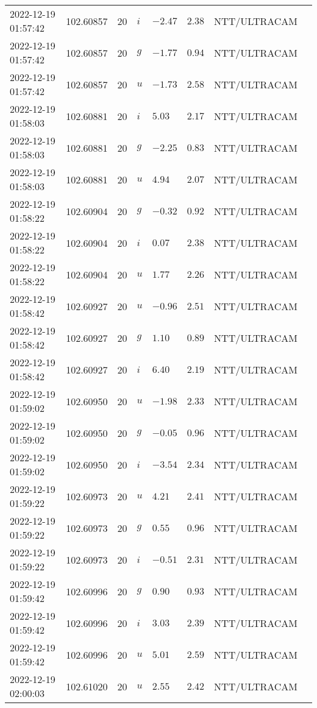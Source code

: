 \documentclass{nature_plusfigure}
\begin{document}
\begin{supplement}
\begin{center}
\begin{longtable}{llllllll}
2022-12-19 01:57:42 & 102.60857 & 20 & $i$ & $-2.47$ & $2.38$ & NTT/ULTRACAM &  \\ 
2022-12-19 01:57:42 & 102.60857 & 20 & $g$ & $-1.77$ & $0.94$ & NTT/ULTRACAM &  \\ 
2022-12-19 01:57:42 & 102.60857 & 20 & $u$ & $-1.73$ & $2.58$ & NTT/ULTRACAM &  \\ 
2022-12-19 01:58:03 & 102.60881 & 20 & $i$ & $5.03$ & $2.17$ & NTT/ULTRACAM &  \\ 
2022-12-19 01:58:03 & 102.60881 & 20 & $g$ & $-2.25$ & $0.83$ & NTT/ULTRACAM &  \\ 
2022-12-19 01:58:03 & 102.60881 & 20 & $u$ & $4.94$ & $2.07$ & NTT/ULTRACAM &  \\ 
2022-12-19 01:58:22 & 102.60904 & 20 & $g$ & $-0.32$ & $0.92$ & NTT/ULTRACAM &  \\ 
2022-12-19 01:58:22 & 102.60904 & 20 & $i$ & $0.07$ & $2.38$ & NTT/ULTRACAM &  \\ 
2022-12-19 01:58:22 & 102.60904 & 20 & $u$ & $1.77$ & $2.26$ & NTT/ULTRACAM &  \\ 
2022-12-19 01:58:42 & 102.60927 & 20 & $u$ & $-0.96$ & $2.51$ & NTT/ULTRACAM &  \\ 
2022-12-19 01:58:42 & 102.60927 & 20 & $g$ & $1.10$ & $0.89$ & NTT/ULTRACAM &  \\ 
2022-12-19 01:58:42 & 102.60927 & 20 & $i$ & $6.40$ & $2.19$ & NTT/ULTRACAM &  \\ 
2022-12-19 01:59:02 & 102.60950 & 20 & $u$ & $-1.98$ & $2.33$ & NTT/ULTRACAM &  \\ 
2022-12-19 01:59:02 & 102.60950 & 20 & $g$ & $-0.05$ & $0.96$ & NTT/ULTRACAM &  \\ 
2022-12-19 01:59:02 & 102.60950 & 20 & $i$ & $-3.54$ & $2.34$ & NTT/ULTRACAM &  \\ 
2022-12-19 01:59:22 & 102.60973 & 20 & $u$ & $4.21$ & $2.41$ & NTT/ULTRACAM &  \\ 
2022-12-19 01:59:22 & 102.60973 & 20 & $g$ & $0.55$ & $0.96$ & NTT/ULTRACAM &  \\ 
2022-12-19 01:59:22 & 102.60973 & 20 & $i$ & $-0.51$ & $2.31$ & NTT/ULTRACAM &  \\ 
2022-12-19 01:59:42 & 102.60996 & 20 & $g$ & $0.90$ & $0.93$ & NTT/ULTRACAM &  \\ 
2022-12-19 01:59:42 & 102.60996 & 20 & $i$ & $3.03$ & $2.39$ & NTT/ULTRACAM &  \\ 
2022-12-19 01:59:42 & 102.60996 & 20 & $u$ & $5.01$ & $2.59$ & NTT/ULTRACAM &  \\ 
2022-12-19 02:00:03 & 102.61020 & 20 & $u$ & $2.55$ & $2.42$ & NTT/ULTRACAM &  \\ 

\end{longtable}
\end{center}
\end{supplement}
\end{document}
